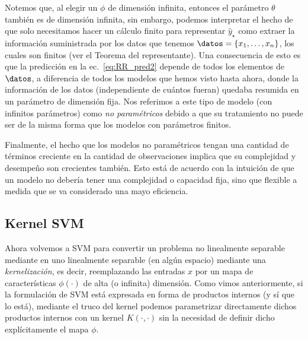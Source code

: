 \begin{remark} 
Notemos que, al elegir un $\phi$ de dimensión infinita, entonces el parámetro $\theta$ también es de dimensión infinita, sin embargo, podemos interpretar el hecho de que solo necesitamos hacer un cálculo finito para representar $\hat{y}_\star$ como extraer la información suministrada por los datos que tenemos $\datos = \{x_1,\ldots,x_n\}$, los cuales son finitos (ver el Teorema del representante). Una consecuencia de esto es que la predicción en la ec.~\eqref{eq:RR_pred2} depende de todos los elementos de $\datos$, a diferencia de todos los modelos que hemos visto hasta ahora, donde la información de los datos (independiente de cuántos fueran) quedaba resumida en un parámetro de dimensión fija. Nos referimos a este tipo de modelo (con infinitos parámetros) como \emph{no paramétricos} debido a que su tratamiento no puede ser de la misma forma que los modelos con parámetros finitos.  
\end{remark}

\begin{remark} 
Finalmente, el hecho que los modelos no paramétricos tengan una cantidad de términos creciente en la cantidad de observaciones implica que su complejidad y desempeño son crecientes también. Esto está de acuerdo con la intuición de que  un modelo no debería tener una complejidad o capacidad fija, sino que flexible a medida que se va considerado una mayo eficiencia.
\end{remark}

\noindent{}



\subsection{Kernel SVM}

Ahora volvemos a SVM para convertir un problema no linealmente separable mediante en uno linealmente separable (en algún espacio) mediante una \emph{kernelización}, es decir, reemplazando las entradas $x$ por un mapa de características $\phi(\cdot)$ de alta (o infinita) dimensión. Como vimos anteriormente, si la formulación de SVM está expresada en forma de productos internos (y sí que lo está), mediante el truco del kernel podemos parametrizar directamente dichos productos internos con un kernel $K(\cdot,\cdot)$ sin la necesidad de definir dicho explícitamente el mapa $\phi$. 

